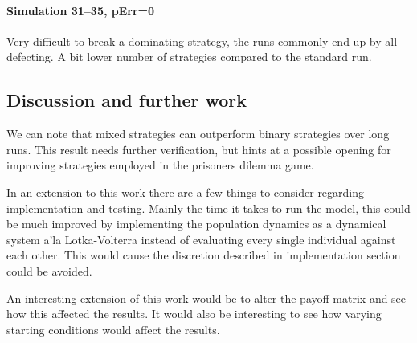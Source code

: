  

\paragraph{Simulation 31--35, pErr=0}
Very difficult to break a dominating strategy, the runs commonly end up by all defecting. A bit lower number of strategies compared to the standard run. 


\subsection{Discussion and further work}
We can note that mixed strategies can outperform binary strategies over long runs. This result needs further verification, but hints at a possible opening for improving strategies employed in the prisoners dilemma game.

In an extension to this work there are a few things to consider regarding implementation and testing. Mainly the time it takes to run the model, this could be much improved by implementing the population dynamics as a dynamical system a'la Lotka-Volterra instead of evaluating every single individual against each other. This would cause the discretion described in implementation section could be avoided.

An interesting extension of this work would be to alter the payoff matrix and see how this affected the results. It would also be interesting to see how varying starting conditions would affect the results.





